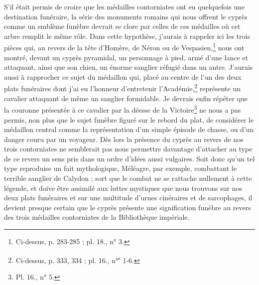 \documentclass{article}
\begin{document}
S'il était permis de croire que les médailles contorniates ont eu quelquefois une destination funéraire, la série des monuments romains qui nous offrent le cyprès comme un emblème funèbre devrait se clore par celles de ces médailles où cet arbre remplit le même rôle. Dans cette hypothèse, j'aurais à rappeler ici les trois pièces qui, au revers de la tête d'Homère, de Néron ou de Vespasien,\footnote{Ci-dessus, p. 283-285 ; pl. 18., n° 3.} nous ont montré, devant un cyprès pyramidal, un personnage à pied, armé d'une lance et attaquant, ainsi que son chien, un énorme sanglier réfugié dans un antre. J'aurais aussi à rapprocher ce sujet du médaillon qui, placé au centre de l'un des deux plats funéraires dont j'ai eu l'honneur d'entretenir l'Académie,\footnote{Ci-dessus, p. 333, 334 ; pl. 16., n°\textsuperscript{s} 1-6.} représente un cavalier attaquant de même un sanglier formidable. Je devrais enfin répéter que la couronne présentée à ce cavalier par la déesse de la Victoire\footnote{Pl. 16., n° 5.} ne nous a pas permis, non plus que le sujet funèbre figuré sur le rebord du plat, de considérer le médaillon central comme la représentation d'un simple épisode de chasse, ou d'un danger couru par un voyageur. Dès lors la présence du cyprès au revers de nos trois contorniates ne semblerait pas nous permettre davantage d'attacher au type de ce revers un sens pris dans un ordre d'idées aussi vulgaires. Soit donc qu'un tel type reproduise un fait mythologique, Méléagre, par exemple, combattant le terrible sanglier de Calydon ; sort que le combat ne se rattache nullement à cette légende, et doive être assimilé aux luttes mystiques que nous trouvons sur nos deux plats funéraires et sur une multitude d'urnes cinéraires et de sarcophages, il devient presque certain que le cyprès présente une signification funèbre au revers des trois médailles contorniates de la Bibliothèque impériale.
\end{document}
